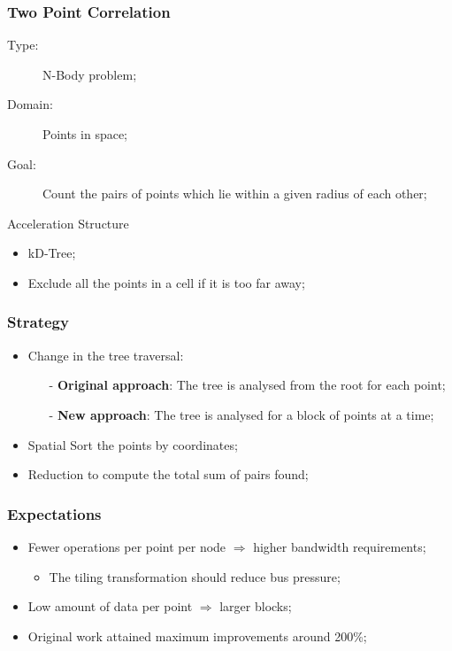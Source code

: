\begin{frame}
	\frametitle{Two Point Correlation}
	\vfill
	\begin{description}
		\item[Type:] N-Body problem;
		\item[Domain:] Points in space;
		\item[Goal:] Count the pairs of points which lie within a given radius of each other;
	\end{description}
	\vfill
	\begin{block}{Acceleration Structure}
		\begin{itemize}
			\item kD-Tree;
			\item Exclude all the points in a cell if it is too far away;
		\end{itemize}
	\end{block}
	\vfill
\end{frame}

\begin{frame}
	\frametitle{Strategy}
	\begin{itemize}\itemsep=20pt
		\item Change in the tree traversal:
		\begin{itemize}
			\item[-] \textbf{Original approach}: The tree is analysed from the root for each point;
			\item[-] \textbf{New approach}: The tree is analysed for a block of points at a time;
		\end{itemize}
		\item Spatial Sort the points by coordinates;
		\item Reduction to compute the total sum of pairs found;
	\end{itemize}
\end{frame}

\begin{frame}
	\frametitle{Expectations}
	\begin{itemize}\itemsep=20pt
		\item Fewer operations per point per node $\Rightarrow$ higher bandwidth requirements;
		\begin{itemize}
			\item The tiling transformation should reduce bus pressure;
		\end{itemize}
		\item Low amount of data per point $\Rightarrow$ larger blocks;
		\item Original work attained maximum improvements around 200\%;
	\end{itemize}
\end{frame}
